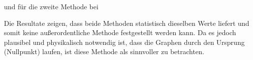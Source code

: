 und für die zweite Methode bei

Die Resultate zeigen, dass beide Methoden statistisch dieselben Werte liefert und somit keine außerordentliche Methode festgestellt werden kann. Da es jedoch plausibel und physikalisch notwendig ist, dass die Graphen durch den Ursprung (Nullpunkt) laufen, ist diese Methode als sinnvoller zu betrachten.



